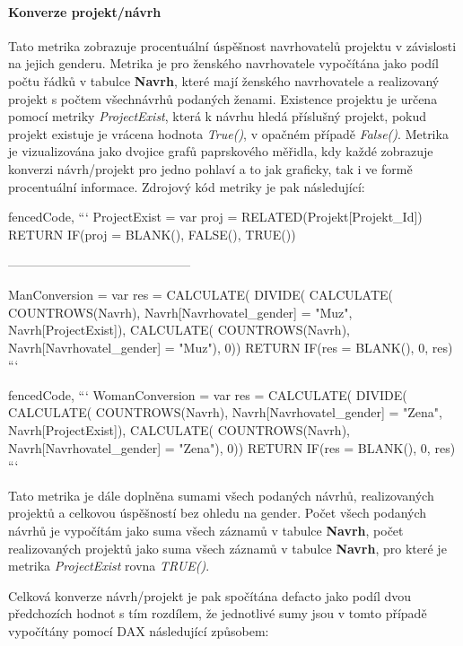 \documentclass[
  digital,     %
  twoside,     %
  lof,         %
  lot,         %
]{fithesis4}
\begin{document}
\paragraph{Konverze projekt/návrh} Tato metrika zobrazuje procentuální úspěšnost navrhovatelů projektu v závislosti na jejich genderu. Metrika je pro ženského navrhovatele vypočítána jako podíl počtu řádků v tabulce \textbf{Navrh}, které mají ženského navrhovatele a realizovaný projekt s počtem všechnávrhů podaných ženami. Existence projektu je určena pomocí metriky \emph{ProjectExist}, která k návrhu hledá příslušný projekt, pokud projekt existuje je vrácena hodnota \emph{True()}, v opačném případě \emph{False()}. Metrika je vizualizována jako dvojice grafů paprskového měřidla, kdy každé zobrazuje konverzi návrh/projekt pro jedno pohlaví a to jak graficky, tak i ve formě procentuální informace.
Zdrojový kód metriky je pak následující:

\begin{markdown*}{%
  fencedCode,
}
```
ProjectExist = 
    var proj = RELATED(Projekt[Projekt_Id]) 
RETURN IF(proj = BLANK(), FALSE(), TRUE())

--------------------------------------------

ManConversion = 
    var res = CALCULATE(
        DIVIDE(
            CALCULATE(
                COUNTROWS(Navrh), 
                    Navrh[Navrhovatel_gender] = "Muz", Navrh[ProjectExist]),
            CALCULATE(
                COUNTROWS(Navrh),
                    Navrh[Navrhovatel_gender] = "Muz"), 0))
RETURN IF(res = BLANK(), 0, res)
```
\end{markdown*}
\newpage
\begin{markdown*}{%
  fencedCode,
}
```
WomanConversion = 
    var res = CALCULATE(
        DIVIDE(
            CALCULATE(
                COUNTROWS(Navrh), 
                Navrh[Navrhovatel_gender] = "Zena", Navrh[ProjectExist]),
            CALCULATE(
                COUNTROWS(Navrh),
                Navrh[Navrhovatel_gender] = "Zena"), 0))
RETURN IF(res = BLANK(), 0, res)
```
\end{markdown*}


Tato metrika je dále doplněna sumami všech podaných návrhů, realizovaných projektů a celkovou úspěšností bez ohledu na gender. Počet všech podaných návrhů je vypočítám jako suma všech záznamů v tabulce \textbf{Navrh}, počet realizovaných projektů jako suma všech záznamů v tabulce \textbf{Navrh}, pro které je metrika \emph{ProjectExist} rovna \emph{TRUE()}.

Celková konverze návrh/projekt je pak spočítána defacto jako podíl dvou předchozích hodnot s tím rozdílem, že jednotlivé sumy jsou v tomto případě vypočítány pomocí DAX následující způsobem:
\end{document}

